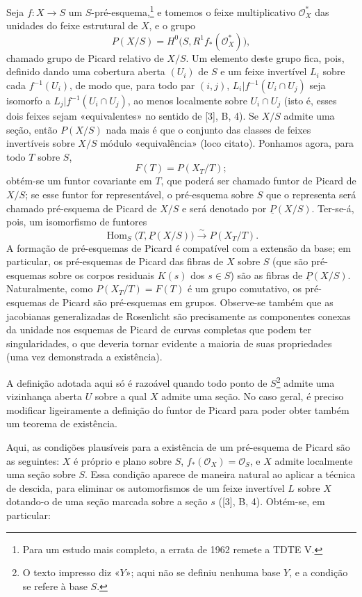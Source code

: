 Seja $f:X\longrightarrow S$ um $S$-pré-esquema,\footnote{Para um estudo mais
completo, a errata de 1962 remete a TDTE V.} e tomemos o feixe
multiplicativo $\mathcal O_X^*$ das unidades do feixe estrutural de $X$, e
o grupo
\[
  P(X/S)=H^0\bigl(S,R^1f_*(\mathcal O_X^*)\bigr),
\]
chamado grupo de Picard relativo de $X/S$. Um elemento deste grupo fica,
pois, definido dando uma cobertura aberta $(U_i)$ de $S$ e um feixe invertível
$L_i$ sobre cada $f^{-1}(U_i)$, de modo que, para todo par $(i,j)$,
$L_i|f^{-1}(U_i\cap U_j)$ seja isomorfo a $L_j|f^{-1}(U_i\cap U_j)$, ao menos
localmente sobre $U_i\cap U_j$ (isto é, esses dois feixes sejam «equivalentes»
no sentido de [3], B, 4). Se $X/S$ admite uma seção, então $P(X/S)$ nada mais
é que o conjunto das classes de feixes invertíveis sobre $X/S$ módulo
«equivalência» (loco citato). Ponhamos agora, para todo $T$ sobre $S$,
\[
  F(T)=P(X_T/T) ;
\]
obtém-se um funtor covariante em $T$, que poderá ser chamado funtor de Picard de
$X/S$; se esse funtor for representável, o pré-esquema sobre $S$ que o
representa será chamado pré-esquema de Picard de $X/S$ e será denotado por
$\underline P(X/S)$. Ter-se-á, pois, um isomorfismo de funtores
\[
  \operatorname{Hom}_S\bigl(T,\underline P(X/S)\bigr)
  \xrightarrow{\sim}P(X_T/T).
\]
A formação de pré-esquemas de Picard é compatível com a extensão da
base; em particular, os pré-esquemas de Picard das fibras de $X$ sobre $S$
(que são pré-esquemas sobre os corpos residuais $K(s)$ dos $s\in S$) são
as fibras de $\underline P(X/S)$. Naturalmente, como $P(X_T/T)=F(T)$ é um
grupo comutativo, os pré-esquemas de Picard são pré-esquemas em grupos.
Observe-se também que as jacobianas generalizadas de Rosenlicht são precisamente
as componentes conexas da unidade nos esquemas de Picard de curvas
completas que podem ter singularidades, o que deveria tornar evidente a
maioria de suas propriedades (uma vez demonstrada a existência).

 A definição adotada aqui só é razoável quando
todo ponto de $S$\footnote{O texto impresso diz «$Y$»; aqui não se definiu
nenhuma base $Y$, e a condição se refere à base $S$.} admite uma vizinhança
aberta $U$ sobre a qual $X$ admite uma seção. No caso geral, é preciso
modificar ligeiramente a definição do funtor de Picard para poder obter
também um teorema de existência.

Aqui, as condições plausíveis para a existência de um pré-esquema de Picard
são as seguintes: $X$ é próprio e plano sobre $S$,
$f_*(\mathcal O_X)=\mathcal O_S$, e $X$ admite localmente uma seção sobre
$S$. Essa condição aparece de maneira natural ao aplicar a técnica de
descida, para eliminar os automorfismos de um feixe invertível $L$ sobre $X$
dotando-o de uma seção marcada sobre a seção $s$ ([3], B, 4). Obtém-se,
em particular:

